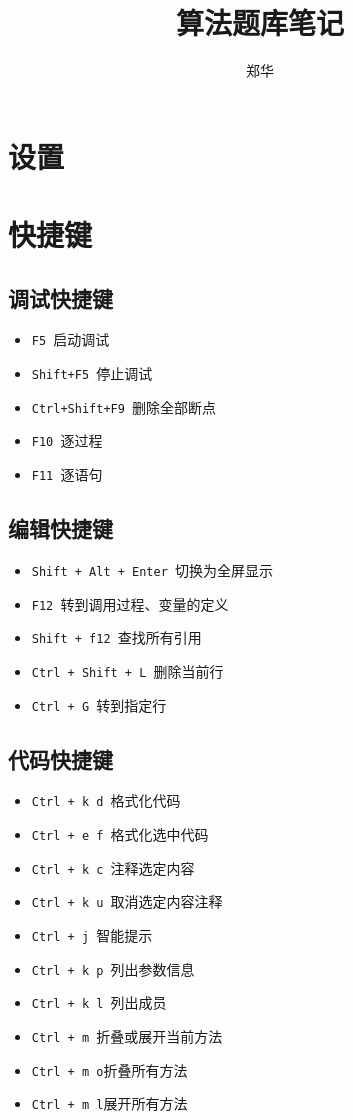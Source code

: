 \documentclass[UTF8,a4paper,12pt]{ctexbook}
\author{\kaishu 郑华}
\title{\heiti 算法题库笔记}
\begin{document}
 	\maketitle
\chapter{设置}

\chapter{快捷键}
	\section{调试快捷键}
		\begin{itemize}
			\item \verb|F5 |启动调试
			\item \verb|Shift+F5 |停止调试
			\item \verb|Ctrl+Shift+F9 |删除全部断点
			\item \verb|F10 |逐过程
			\item \verb|F11 |逐语句
		\end{itemize}
	
	\section{编辑快捷键}
		\begin{itemize}
			\item \verb|Shift + Alt + Enter |切换为全屏显示
			\item \verb|F12 |转到调用过程、变量的定义
			\item \verb|Shift + f12 |查找所有引用
			\item \verb|Ctrl + Shift + L |删除当前行
			\item \verb|Ctrl + G |转到指定行
		\end{itemize}
	
	\section{代码快捷键}
		\begin{itemize}
			\item \verb|Ctrl + k d |格式化代码
			\item \verb|Ctrl + e f |格式化选中代码
			\item \verb|Ctrl + k c |注释选定内容
			\item \verb|Ctrl + k u |取消选定内容注释
			\item \verb|Ctrl + j |智能提示
			\item \verb|Ctrl + k p |列出参数信息
			\item \verb|Ctrl + k l |列出成员
			\item \verb|Ctrl + m |折叠或展开当前方法
			\item \verb|Ctrl + m o|折叠所有方法
			\item \verb|Ctrl + m l|展开所有方法
		\end{itemize}
	
\end{document}
